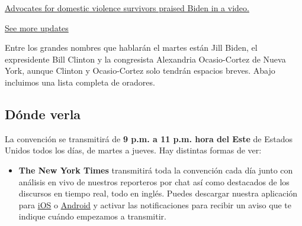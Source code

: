 \href{https://www.nytimes3xbfgragh.onion/live/2020/08/19/us/dnc-convention-election?action=click\&pgtype=Article\&state=default\&region=MAIN_CONTENT_1\&context=storylines_live_updates\#advocates-for-domestic-violence-survivors-praised-biden-in-a-video}{Advocates
for domestic violence survivors praised Biden in a video.}

\href{https://www.nytimes3xbfgragh.onion/live/2020/08/19/us/dnc-convention-election?action=click\&pgtype=Article\&state=default\&region=MAIN_CONTENT_1\&context=storylines_live_updates}{See
more updates}

Entre los grandes nombres que hablarán el martes están Jill Biden, el
expresidente Bill Clinton y la congresista Alexandria Ocasio-Cortez de
Nueva York, aunque Clinton y Ocasio-Cortez solo tendrán espacios breves.
Abajo incluimos una lista completa de oradores.

\hypertarget{duxf3nde-verla}{%
\subsection{Dónde verla}\label{duxf3nde-verla}}

La convención se transmitirá de \textbf{9 p.m. a 11 p.m. hora del Este}
de Estados Unidos todos los días, de martes a jueves. Hay distintas
formas de ver:

\begin{itemize}
\tightlist
\item
  \textbf{The New York Times} transmitirá toda la convención cada día
  junto con análisis en vivo de nuestros reporteros por chat así como
  destacados de los discursos en tiempo real, todo en inglés. Puedes
  descargar nuestra aplicación para
  \href{https://slack-redir.net/link?url=https\%3A\%2F\%2Fsearch.itunes.apple.com\%2FWebObjects\%2FMZContentLink.woa\%2Fwa\%2Flink\%3Fmt\%3D8\%26path\%3Dapps\%252fnytimes}{iOS}
  o
  \href{https://slack-redir.net/link?url=https\%3A\%2F\%2Fhelp.nytimes3xbfgragh.onion\%2Fhc\%2Fen-us\%2Farticles\%2F115015970768-Android}{Android}
  y activar las notificaciones para recibir un aviso que te indique
  cuándo empezamos a transmitir.
\end{itemize}

